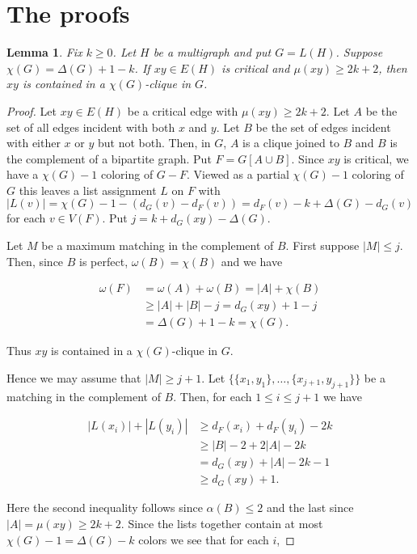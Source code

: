 \documentclass[12pt]{article}
\theoremstyle{plain}
\newtheorem{lem}[thm]{Lemma}
\theoremstyle{definition}
\theoremstyle{remark}
\begin{document}
\section{The proofs}
\begin{lem}\label{muBoundLemma}
Fix $k \geq 0$. Let $H$ be a multigraph and put $G = L(H)$.  Suppose $\chi(G) = \Delta(G) + 1 - k$. If $xy \in E(H)$ is critical and $\mu(xy) \geq 2k + 2$, then $xy$ is contained in a $\chi(G)$-clique in $G$.
\end{lem}
\begin{proof}
Let $xy \in E(H)$ be a critical edge with $\mu(xy) \geq 2k + 2$.  Let $A$ be the set of all edges incident with both $x$ and $y$.  Let $B$ be the set of edges incident with either $x$ or $y$ but not both.  Then, in $G$, $A$ is a clique joined to $B$ and $B$ is the complement of a bipartite graph.  Put $F = G[A \cup B]$.  Since $xy$ is critical, we have a $\chi(G) - 1$ coloring of $G - F$.  Viewed as a partial $\chi(G) - 1$ coloring of $G$ this leaves a list assignment $L$ on $F$ with 
$|L(v)| = \chi(G) - 1 - (d_G(v) - d_F(v)) = d_F(v) - k + \Delta(G) - d_G(v)$ for each $v \in V(F)$.  Put $j = k + d_G(xy) - \Delta(G)$.

Let $M$ be a maximum matching in the complement of $B$.  First suppose $|M| \leq j$.  Then, since $B$ is perfect, $\omega(B) = \chi(B)$ and we have

\begin{align*}
\omega(F) &= \omega(A) + \omega(B) = |A| + \chi(B) \\
&\geq |A| + |B| - j = d_G(xy) + 1 - j \\
&= \Delta(G) + 1 - k = \chi(G).
\end{align*}

\noindent Thus $xy$ is contained in a $\chi(G)$-clique in $G$.

Hence we may assume that $|M| \geq j + 1$.  Let $\{\{x_1, y_1\}, \ldots, \{x_{j+1}, y_{j+1}\}\}$ be a matching in the complement of $B$.  Then, for each $1 \leq i \leq j + 1$ we have

\begin{align*}
|L(x_i)| + |L(y_i)| &\geq d_F(x_i) + d_F(y_i) - 2k \\
&\geq |B| - 2 + 2|A| - 2k \\
&= d_G(xy) + |A| - 2k - 1 \\
&\geq d_G(xy) + 1.
\end{align*}

Here the second inequality follows since $\alpha(B) \leq 2$ and the last since $|A| = \mu(xy) \geq 2k + 2$.  Since the lists together contain at most $\chi(G) - 1 = \Delta(G) - k$ colors we see that for each $i$,


\end{proof}
\end{document}
